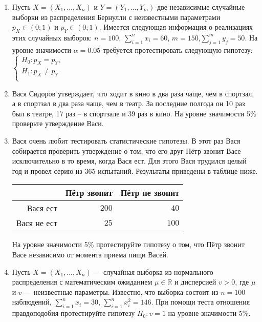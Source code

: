 \documentclass[12pt]{article}
\begin{document}
\begin{enumerate}
\item Пусть $X = (X_{1},..., X_{n})$ и $Y = (Y_{1},..., Y_{m})$-две независимые случайные выборки из распределения Бернулли с неизвестными параметрами $p_{X} \in (0; 1)$ и $p_{Y} \in (0; 1)$. Имеется следующая информация о реализациях этих случайных выборок: $n = 100$, $\sum_{i=1}^{n} x_{i} = 60$, $m = 150$,$\sum_{j=1}^{m} y_{j} = 50$. На уровне значимости $\alpha = 0.05$ требуется протестировать следующую гипотезу:
$\begin{cases}
H_{0}:p_{X} = p_{Y}, \\
H_{1}:p_{X} \neq p_{Y} \\
\end{cases}$

\item Вася Сидоров утверждает, что ходит в кино в два раза чаще, чем в спортзал, а в спортзал в два раза чаще, чем в театр. За последние полгода он 10 раз был в театре, 17 раз – в спортзале и 39 раз в кино. На уровне значимости 5\% проверьте утверждение Васи.

\item Вася очень любит тестировать статистические гипотезы. В этот раз Вася собирается проверить утверждение о том, что его друг Пётр звонит Васе исключительно в то время, когда Вася ест. Для этого Вася трудился целый год и провел серию из 365 испытаний. Результаты приведены в таблице ниже.
\begin{center}\begin{tabular}{r|rr}
\toprule
   & Пётр звонит   & Пётр не звонит  \\ \midrule
Вася ест           & $200$ & $40$ \\
 Вася не ест       & $25$ & $100$  \\ \bottomrule
\end{tabular}\end{center}
На уровне значимости 5\% протестируйте гипотезу о том, что Пётр звонит Васе
независимо от момента приема пищи Васей.

\item Пусть $X = (X_{1},..., X_{n})$ — случайная выборка из нормального распределения
с математическим ожиданием $\mu \in \mathbb{R}$ и дисперсией $v > 0$, где $\mu$ и $v$ — неизвестные параметры. Известно, что выборка состоит из $n = 100$ наблюдений, $\sum_{i=1}^{n} x_{i} = 30$, $\sum_{i=1}^{n} x^2_{i} = 146$. При помощи теста отношения правдоподобия протестируйте гипотезу $H_{0}:v = 1$ на уровне значимости 5\%.

\end{enumerate}
\end{document}
